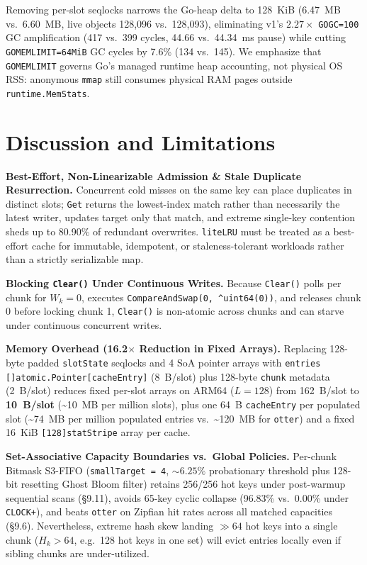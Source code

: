 \documentclass[11pt,a4paper]{article}
\begin{document}
Removing per-slot seqlocks narrows the Go-heap delta to 128~KiB (6.47~MB vs.\ 6.60~MB, live objects 128,096 vs.\ 128,093), eliminating v1's $2.27\times$ \texttt{GOGC=100} GC amplification (417 vs.\ 399 cycles, 44.66 vs.\ 44.34~ms pause) while cutting \texttt{GOMEMLIMIT=64MiB} GC cycles by 7.6\% (134 vs.\ 145). We emphasize that \texttt{GOMEMLIMIT} governs Go's managed runtime heap accounting, not physical OS RSS: anonymous \texttt{mmap} still consumes physical RAM pages outside \texttt{runtime.MemStats}.

\section{Discussion and Limitations}

\textbf{Best-Effort, Non-Linearizable Admission \& Stale Duplicate Resurrection.} Concurrent cold misses on the same key can place duplicates in distinct slots; \texttt{Get} returns the lowest-index match rather than necessarily the latest writer, updates target only that match, and extreme single-key contention sheds up to 80.90\% of redundant overwrites. \texttt{liteLRU} must be treated as a best-effort cache for immutable, idempotent, or staleness-tolerant workloads rather than a strictly serializable map.

\textbf{Blocking \texttt{Clear()} Under Continuous Writes.} Because \texttt{Clear()} polls per chunk for $W_k=0$, executes \texttt{CompareAndSwap(0, \textasciicircum uint64(0))}, and releases chunk 0 before locking chunk 1, \texttt{Clear()} is non-atomic across chunks and can starve under continuous concurrent writes.

\textbf{Memory Overhead (16.2$\times$ Reduction in Fixed Arrays).} Replacing 128-byte padded \texttt{slotState} seqlocks and 4 SoA pointer arrays with \texttt{entries []atomic.Pointer[cacheEntry]} (8~B/slot) plus 128-byte \texttt{chunk} metadata (2~B/slot) reduces fixed per-slot arrays on ARM64 ($L=128$) from 162~B/slot to \textbf{10~B/slot} (\textasciitilde 10~MB per million slots), plus one 64~B \texttt{cacheEntry} per populated slot (\textasciitilde 74~MB per million populated entries vs.\ \textasciitilde 120~MB for \texttt{otter}) and a fixed 16~KiB \texttt{[128]statStripe} array per cache.

\textbf{Set-Associative Capacity Boundaries vs.\ Global Policies.} Per-chunk Bitmask S3-FIFO (\texttt{smallTarget = 4}, $\sim 6.25\%$ probationary threshold plus 128-bit resetting Ghost Bloom filter) retains 256/256 hot keys under post-warmup sequential scans (\S 9.11), avoids 65-key cyclic collapse (96.83\% vs.\ 0.00\% under \texttt{CLOCK+}), and beats \texttt{otter} on Zipfian hit rates across all matched capacities (\S 9.6). Nevertheless, extreme hash skew landing $\gg 64$ hot keys into a single chunk ($H_k > 64$, e.g.\ 128 hot keys in one set) will evict entries locally even if sibling chunks are under-utilized.
\end{document}
